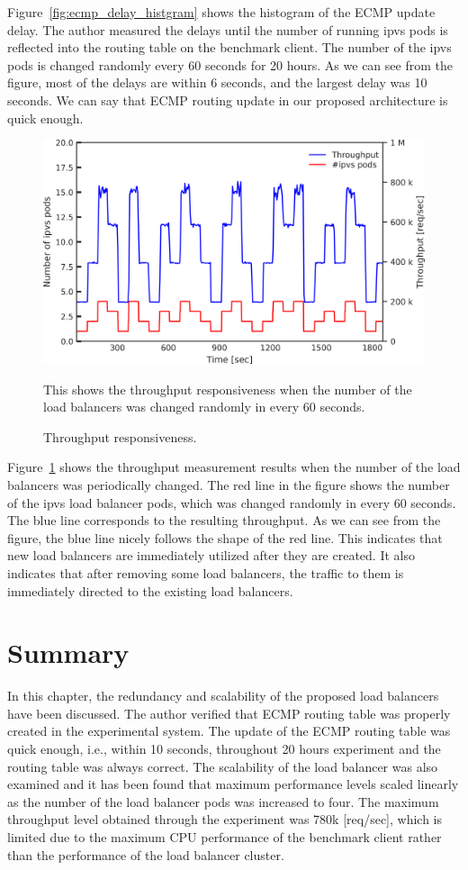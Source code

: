 Figure~\ref{fig:ecmp_delay_histgram} shows the histogram of the ECMP update delay.
The author measured the delays until the number of running ipvs pods is reflected into the routing table on the benchmark client.
The number of the ipvs pods is changed randomly every 60 seconds for 20 hours.
As we can see from the figure, most of the delays are within 6 seconds, and the largest delay was 10 seconds.
We can say that ECMP routing update in our proposed architecture is quick enough.

\begin{figure}[t]
  \includegraphics[width=0.98\columnwidth,left]{Figs/ecmp_response}
  \caption{Throughput responsiveness.}
This shows the throughput responsiveness when the number of the load balancers was changed randomly in every 60 seconds. 
  \label{fig:ecmp_response}
\end{figure}

Figure~\ref{fig:ecmp_response} shows the throughput measurement results when the number of the load balancers was periodically changed. 
The red line in the figure shows the number of the ipvs load balancer pods, which was changed randomly in every 60 seconds.
The blue line corresponds to the resulting throughput.
As we can see from the figure, the blue line nicely follows the shape of the red line.
This indicates that new load balancers are immediately utilized after they are created.
It also indicates that after removing some load balancers, the traffic to them is immediately directed to the existing load balancers.

\FloatBarrier

\section{Summary}

In this chapter, the redundancy and scalability of the proposed load balancers have been discussed.
The author verified that ECMP routing table was properly created in the experimental system.
The update of the ECMP routing table was quick enough, i.e., within 10 seconds, throughout 20 hours experiment and the routing table was always correct.
The scalability of the load balancer was also examined and it has been found that maximum performance levels scaled linearly as the number of the load balancer pods was increased to four.
The maximum throughput level obtained through the experiment was 780k [req/sec], which is limited due to the maximum CPU performance of the benchmark client rather than the performance of the load balancer cluster.


